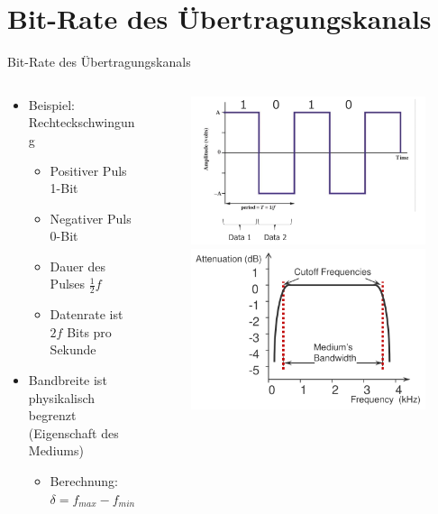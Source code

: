 \documentclass[xcolor=dvipsnames,aspectratio=169]{beamer}
\begin{document}
\section{Bit-Rate des Übertragungskanals}
\begin{frame}{Bit-Rate des Übertragungskanals}
\begin{columns}[T] %
\begin{column}{.6\textwidth}
\begin{itemize}
	\item Beispiel: Rechteckschwingung 
	\begin{itemize}
		\item Positiver Puls 1-Bit
		\item Negativer Puls 0-Bit
		\item Dauer des Pulses $\frac{1}{2}f$
		\item Datenrate ist $2f$ Bits pro Sekunde
	\end{itemize}
	\item Bandbreite ist physikalisch begrenzt (Eigenschaft des Mediums)
	\begin{itemize}
		\item Berechnung: $\delta = f_{max} - f_{min}$
	\end{itemize}
\end{itemize}
\end{column}%
\hfill%
\begin{column}{.4\textwidth}
\vspace*{-.7cm}
\begin{figure}
\centering
\includegraphics[scale=0.25]{square}
\includegraphics[scale=0.25]{bw}

\end{figure}
\end{column}
\end{columns}
\end{frame}
\end{document}
